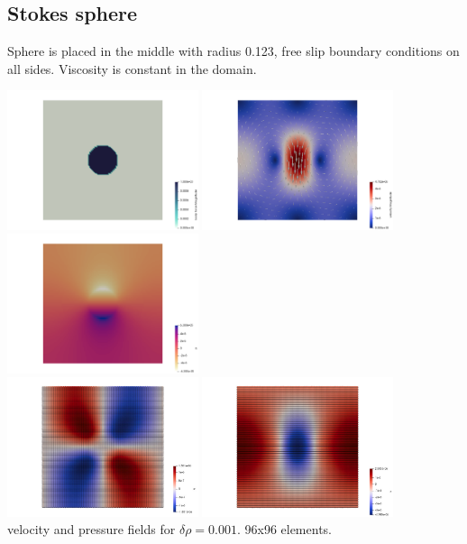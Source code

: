 \subsection*{Stokes sphere}

Sphere is placed in the middle with radius 0.123, free slip boundary conditions on all sides. 
Viscosity is constant in the domain. 

\begin{center}
\includegraphics[width=5.6cm]{python_codes/fieldstone_80/results/sphere/rho_g}
\includegraphics[width=5.6cm]{python_codes/fieldstone_80/results/sphere/vel}
\includegraphics[width=5.6cm]{python_codes/fieldstone_80/results/sphere/p}\\
\includegraphics[width=5.6cm]{python_codes/fieldstone_80/results/sphere/u_dofs}
\includegraphics[width=5.6cm]{python_codes/fieldstone_80/results/sphere/v_dofs}\\
{\captionfont velocity and pressure fields for $\delta \rho=0.001$. 96x96 elements.}
\end{center}

